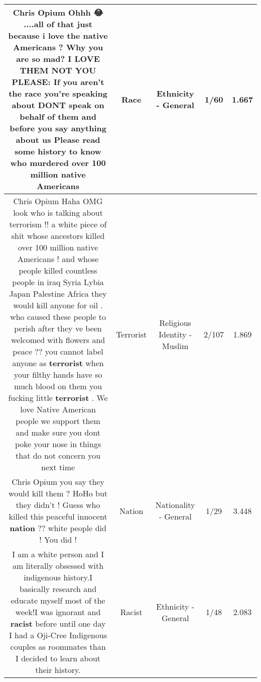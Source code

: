 \documentclass[11pt]{article}
\newlength\mylength
\begin{document}
\begin{center}
\begin{longtable}{|C{.65\mylength}|C{.30\mylength}|C{.12\mylength}|C{.12\mylength}|C{.12\mylength}|}
  \small Chris Opium Ohhh 😂 ....all of that just because i love the native Americans ? Why you are so mad?  I LOVE THEM NOT YOU PLEASE: If you aren't the \textbf{race} you're speaking about DONT speak on behalf of them and before you say anything about us Please read some  history to know who  murdered over 100 million native Americans\normalsize   & Race & Ethnicity - General & 1/60 & 1.667 \\  \hline
  \small Chris Opium Haha OMG look who is talking about terrorism !! a white piece of shit whose ancestors killed over 100 million native Americans ! and whose people  killed countless people in iraq Syria Lybia  Japan  Palestine Africa they would kill anyone for oil . who caused these people to perish after they ve been welcomed with flowers and peace ?? you cannot label anyone as \textbf{terrorist} when your filthy hands have so much blood on them you fucking little \textbf{terrorist} . We love Native American people we support them and make sure you dont poke your nose in things that do not concern you next time\normalsize   & Terrorist & Religious Identity - Muslim & 2/107 & 1.869 \\  \hline
  \small Chris Opium  you say they would kill them ? HoHo but they didn't ! Guess who killed this peaceful innocent \textbf{nation} ??  white people did ! You did !\normalsize   & Nation & Nationality - General & 1/29 & 3.448 \\  \hline
  \small I am a white person and I am literally obsessed with indigenous history.I basically research and educate myself most of the week!I was ignorant and \textbf{racist} before until one day I had a Oji-Cree Indigenous couples as roommates than I decided to learn about their history.\normalsize   & Racist & Ethnicity - General & 1/48 & 2.083 \\  \hline

\end{longtable}
\end{center}
\end{document}
